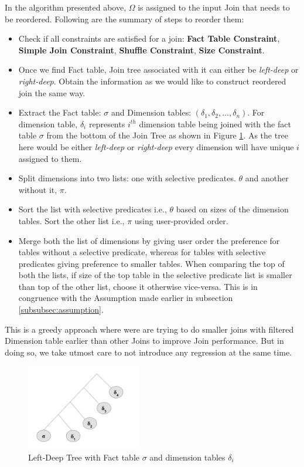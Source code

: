In the algorithm presented above, $\Omega$ is assigned to the input Join that needs to be reordered. Following are the summary of steps to reorder them:
\begin{itemize}
\item Check if all constraints are satisfied for a join: \textbf{Fact Table Constraint}, \textbf{Simple Join Constraint}, \textbf{Shuffle Constraint}, \textbf{Size Constraint}.
\item Once we find Fact table, Join tree associated with it can either be \textit{left-deep} or \textit{right-deep}. Obtain the information as we would like to construct reordered join the same way.
\item Extract the Fact table: $\sigma$ and Dimension tables: $ (\delta_1, \delta_2, \ldots, \delta_n)$. For dimension table, $\delta_i$ represents  $i^{th}$ dimension table being joined with the fact table $\sigma$ from the bottom of the Join Tree as shown in Figure \ref{left-deep}. As the tree here would be either \textit{left-deep} or \textit{right-deep} every dimension will have unique $i$ assigned to them.
\item Split dimensions into two lists: one with selective predicates. $\theta$ and another without it, $\pi$.
\item Sort the list with selective predicates i.e., $\theta$ based on sizes of the dimension tables. Sort the other list i.e., $\pi$ using user-provided order.
\item Merge both the list of dimensions by giving user order the preference for tables without a selective predicate, whereas for tables with selective predicates giving preference to smaller tables. When comparing the top of both the lists, if size of the top table in the selective predicate list is smaller than top of the other list, choose it otherwise vice-versa. This is in congruence with the Assumption made earlier in subsection \ref{subsubsec:assumption}.
\end{itemize}

This is a greedy approach where were are trying to do smaller joins with filtered Dimension table earlier than other Joins to improve Join performance. But in doing so, we take utmost care to not introduce any regression at the same time.

\begin{figure}[ht]
\centerline{\includegraphics[width=5cm]{fig/left-deep.png}}
\caption{Left-Deep Tree with Fact table $\sigma$ and dimension tables $\delta_i$}
\label{left-deep}
\end{figure}

